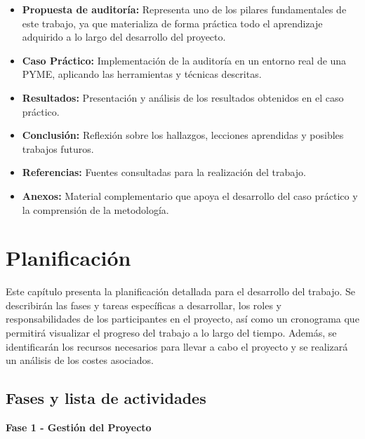 \documentclass[a4paper, 11pt]{article}
\begin{document}
\begin{itemize}
    \item \textbf{Propuesta de auditoría:} Representa uno de los pilares fundamentales de este trabajo, ya que materializa de forma práctica todo el aprendizaje adquirido a lo largo del desarrollo del proyecto.

    
    \item \textbf{Caso Práctico:} Implementación de la auditoría en un entorno real de una PYME, aplicando las herramientas y técnicas descritas.
    
    \item \textbf{Resultados:} Presentación y análisis de los resultados obtenidos en el caso práctico.
    
    \item \textbf{Conclusión:} Reflexión sobre los hallazgos, lecciones aprendidas y posibles trabajos futuros.
    
    \item \textbf{Referencias:} Fuentes consultadas para la realización del trabajo.
    
    \item \textbf{Anexos:}  Material complementario que apoya el desarrollo del caso práctico y la comprensión de la metodología.

\end{itemize}




\clearpage

\section{Planificación}
\thispagestyle{nohead}
Este capítulo presenta la planificación detallada para el desarrollo del trabajo. Se describirán las fases y tareas específicas a desarrollar, los roles y responsabilidades de los participantes en el proyecto, así como un cronograma que permitirá visualizar el progreso del trabajo a lo largo del tiempo. Además, se identificarán los recursos necesarios para llevar a cabo el proyecto y se realizará un análisis de los costes asociados.
\par\vspace{0.5cm}

\subsection{Fases y lista de actividades}
\par\vspace{0.5cm}
\textbf{\large Fase 1 - Gestión del Proyecto} \vspace{0.5cm}
\end{document}
